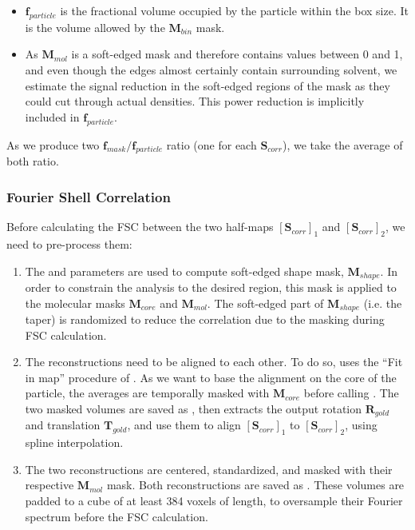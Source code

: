\begin{enumerate}
\begin{itemize}
        \item $\bm{f}_{particle}$ is the fractional volume occupied by the particle within the box size. It is the volume allowed by the $\bm{M}_{bin}$ mask.
        \item As $\bm{M}_{mol}$ is a soft-edged mask and therefore contains values between 0 and 1, and even though the edges almost certainly contain surrounding solvent, we estimate the signal reduction in the soft-edged regions of the mask as they could cut through actual densities. This power reduction is implicitly included in $\bm{f}_{particle}$.
    \end{itemize}
    As we produce two $\bm{f}_{mask} / \bm{f}_{particle}$ ratio (one for each $\bm{S}_{corr}$), we take the average of both ratio.
\end{enumerate}

\subsubsection{Fourier Shell Correlation} \label{sec:algo:avg:fsc}

Before calculating the FSC between the two half-maps ${[\bm{S}_{corr}]}_1$ and ${[\bm{S}_{corr}]}_2$, we need to pre-process them:
\begin{enumerate}
    \item The  and  parameters are used to compute soft-edged shape mask, $\bm{M}_{shape}$. In order to constrain the analysis to the desired region, this mask is applied to the molecular masks $\bm{M}_{core}$ and $\bm{M}_{mol}$. The soft-edged part of $\bm{M}_{shape}$ (i.e. the taper) is randomized to reduce the correlation due to the masking during FSC calculation. 
    
    \item The reconstructions need to be aligned to each other. To do so, {\emClarity} uses the ``Fit in map'' procedure of {\Chimera}. As we want to base the alignment on the core of the particle, the averages are temporally masked with $\bm{M}_{core}$ before calling {\Chimera}. The two masked volumes are saved as , then {\emClarity} extracts the output rotation $\bm{R}_{gold}$ and translation $\bm{T}_{gold}$, and use them to align ${[\bm{S}_{corr}]}_1$ to ${[\bm{S}_{corr}]}_2$, using spline interpolation.
    
    \item The two reconstructions are centered, standardized, and masked with their respective $\bm{M}_{mol}$ mask. Both reconstructions are saved as . These volumes are padded to a cube of at least 384 voxels of length, to oversample their Fourier spectrum before the FSC calculation.
\end{enumerate}

